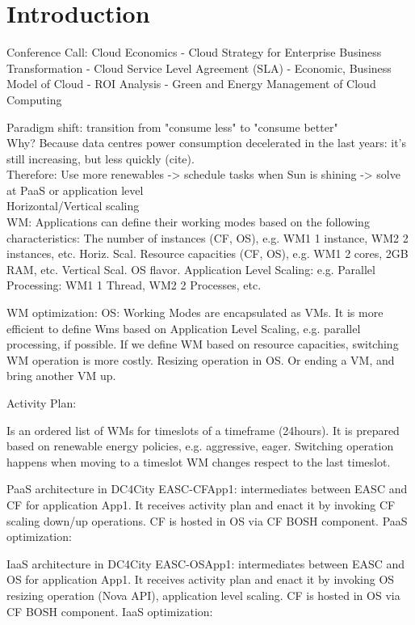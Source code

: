 \section{Introduction}
\label{sec: intro}

Conference Call: Cloud Economics
- Cloud Strategy for Enterprise Business Transformation
- Cloud Service Level Agreement (SLA)
- Economic, Business Model of Cloud
- ROI Analysis
- Green and Energy Management of Cloud Computing

Paradigm shift: transition from "consume less" to "consume better" \\
Why? Because data centres power consumption decelerated in the last years: it's still increasing, but less quickly (cite). \\

Therefore: Use more renewables -> schedule tasks when Sun is shining -> solve at PaaS or application level \\
Horizontal/Vertical scaling \\

WM:
Applications can define their working modes based on the following characteristics:
The number of instances (CF, OS), e.g. WM1 1 instance, WM2 2 instances, etc. Horiz. Scal.
Resource capacities (CF, OS), e.g. WM1 2 cores, 2GB RAM, etc. Vertical Scal. OS flavor.
Application Level Scaling: e.g. Parallel Processing: WM1 1 Thread, WM2 2 Processes, etc.

WM optimization:
OS: Working Modes are encapsulated as VMs.
It is more efficient to define Wms based on Application Level Scaling, e.g. parallel processing, if possible.
If we define WM based on resource capacities,  switching WM operation is more costly.
Resizing operation in OS.
Or ending a VM, and bring another VM up.

Activity Plan:

Is an ordered list of WMs for timeslots of a timeframe (24hours).
It is prepared based on renewable energy policies, e.g. aggressive, eager.
Switching operation happens when moving to a timeslot WM changes respect to the last timeslot.

PaaS architecture in DC4City
EASC-CFApp1: intermediates between EASC and CF for application App1. It receives activity plan and enact it by invoking CF scaling down/up operations.
CF is hosted in OS via CF BOSH component.
PaaS optimization:

IaaS architecture in DC4City
EASC-OSApp1: intermediates between EASC and OS for application App1. It receives activity plan and enact it by invoking OS resizing operation (Nova API), application level scaling.
CF is hosted in OS via CF BOSH component.
IaaS optimization: